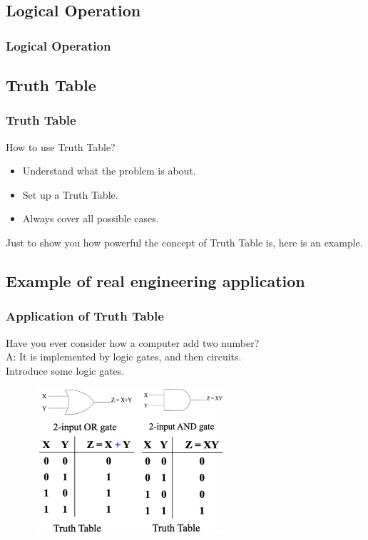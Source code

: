 \documentclass[12pt, t]{beamer}
\begin{document}
\subsection{Logical Operation }
\begin{frame}
    \frametitle{Logical Operation}
\vspace{1.5cm}
    \begin{table}
        \centering
    \end{table}
    
\end{frame}

\subsection{Truth Table}
\begin{frame}
    \frametitle{Truth Table}
    How to use Truth Table?
    \begin{itemize}
        \item Understand what the problem is about.
        \item Set up a Truth Table.
        \item Always cover all possible cases.
    \end{itemize}
Just to show you how powerful the concept of Truth Table is, here is an example.
\end{frame}

\subsection{Example of real engineering application}
\begin{frame}
    \frametitle{Application of Truth Table}
Have you ever consider how a computer add two number?\\
A: It is implemented by logic gates, and then circuits.\\
Introduce some logic gates.
\begin{figure}
    \centering
    \includegraphics[width=7cm]{Figures/Logic.png}
\end{figure}
\end{frame}
\end{document}
